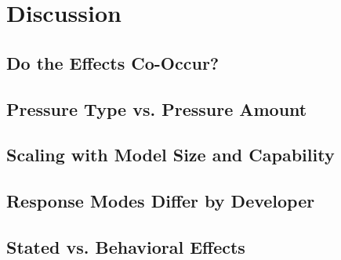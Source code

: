 \section{Discussion}
\label{sec:discussion}

\subsection{Do the Effects Co-Occur?}

\subsection{Pressure Type vs. Pressure Amount}

\subsection{Scaling with Model Size and Capability}

\subsection{Response Modes Differ by Developer}

\subsection{Stated vs. Behavioral Effects}
